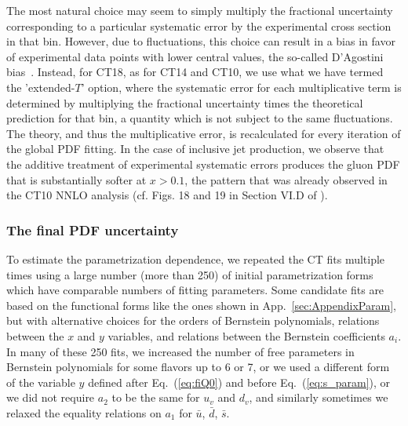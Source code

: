 The most natural choice may seem to simply multiply the fractional uncertainty corresponding to a particular systematic error by the experimental cross section in that bin. However, due to fluctuations, this choice can result in a bias in favor of experimental data points with lower central values, the so-called D'Agostini bias~\cite{DAgostini:1993arp,DAgostini:1999gfj}. Instead, for CT18,  as for CT14 and CT10, we use what we have termed the 'extended-$T$' option, where the systematic error for each multiplicative term is determined by multiplying the fractional uncertainty times the theoretical prediction for that bin, a quantity which is not subject to the same fluctuations. The theory, and thus the multiplicative error, is recalculated for every iteration of the global PDF fitting. In the case of inclusive jet production, we observe that the additive treatment of experimental systematic errors produces the gluon PDF that is substantially softer at $x>0.1$, the pattern that was already observed in the CT10 NNLO analysis (cf. Figs. 18 and 19 in Section VI.D of \cite{Gao:2013xoa}).


\subsubsection{The final PDF uncertainty\label{sec:FinalPDFuncertainty}} 
To estimate the parametrization dependence, we repeated the CT fits multiple times using a large number (more than 250) of initial parametrization forms which have comparable numbers of fitting parameters. Some candidate fits are based on the functional forms like the ones shown in App.~\ref{sec:AppendixParam}, but with alternative choices for the orders of Bernstein polynomials, relations between the $x$ and $y$ variables, and relations between the Bernstein coefficients $a_i$. 
In many of these 250 fits, we increased the number of free parameters in Bernstein polynomials for some flavors up to 6 or 7, or we used a different form of the variable $y$ defined after Eq.~(\ref{eq:fiQ0})  and before Eq.~(\ref{eq:s_param}), or we did not require $a_2$ to be the same for $u_v$ and $d_v$, and similarly sometimes we relaxed the equality relations on $a_1$ for $\bar u$, $\bar d$, $\bar s$.

